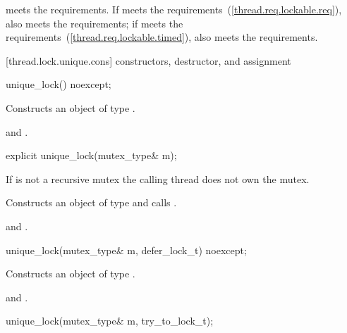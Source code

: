 \pnum
\enternote {} meets the  requirements. If 
meets the  requirements~(\ref{thread.req.lockable.req}),
 also meets the  requirements;
if 
meets the  requirements~(\ref{thread.req.lockable.timed}),
 also meets the  requirements. \exitnote

[thread.lock.unique.cons]{ constructors, destructor, and assignment}

%
\begin{itemdecl}
unique_lock() noexcept;
\end{itemdecl}

\begin{itemdescr}
\pnum
\effects Constructs an object of type .

\pnum
\postconditions {} and .
\end{itemdescr}

%
\begin{itemdecl}
explicit unique_lock(mutex_type& m);
\end{itemdecl}

\begin{itemdescr}
\pnum
\precondition If  is not a recursive mutex the calling thread does not own the mutex.

\pnum
\effects Constructs an object of type  and calls .

\pnum
\postconditions {} and .
\end{itemdescr}

%
\begin{itemdecl}
unique_lock(mutex_type& m, defer_lock_t) noexcept;
\end{itemdecl}

\begin{itemdescr}
\pnum
\effects Constructs an object of type .

\pnum
\postconditions {} and .
\end{itemdescr}

%
\begin{itemdecl}
unique_lock(mutex_type& m, try_to_lock_t);
\end{itemdecl}

